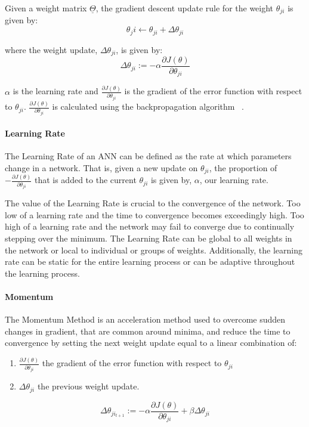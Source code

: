 \documentclass{article}
\begin{document}
Given a weight matrix $\underline\Theta$, the gradient descent update rule for the weight $\theta_{ji}$ is given by:
\begin{equation}
\theta_ji \leftarrow \theta_{ji} + \Delta\theta_{ji}
\end{equation}

where the weight update, $\Delta\theta_{ji}$, is given by:
\begin{equation}
	\Delta\theta_{ji} := -\alpha\frac{\partial{J}(\theta)}{\partial{\theta_{ji}}}
\end{equation}
 

 $\alpha$ is the learning rate and $\frac{\partial{J}(\theta)}{\partial{\theta_{ji}}}$ is the gradient of the error function with respect to $\theta_{ji}$.
$\frac{\partial{J}(\theta)}{\partial{\theta_{ji}}}$ is calculated using the backpropagation algorithm ~\cite{backpropagationOriginal}.

 
\paragraph{Learning Rate}
The Learning Rate of an ANN can be defined as the rate at which parameters change in a network. That is, given a new update on $\theta_{ji}$, the proportion of $-\frac{\partial{J}(\theta)}{\partial{\theta_{ji}}}$ that is added to the current $\theta_{ji}$ is given by, $\alpha$, our learning rate.
\hfill\newline

The value of the Learning Rate is crucial to the convergence of the network. Too low of a learning rate and the time to convergence becomes exceedingly high. Too high of a learning rate and the network may fail to converge due to continually stepping over the minimum. The Learning Rate can be global to all weights in the network or local to individual or groups of weights. Additionally, the learning rate can be static for the entire learning process or can be adaptive throughout the learning process.  
\paragraph{Momentum}
The Momentum Method is an acceleration method \cite{backpropagationOriginal} used to overcome sudden changes in gradient, that are common around minima, and reduce the time to convergence by setting the next weight update equal to a linear combination of:
\begin{enumerate}
	\item $\frac{\partial{J}(\theta)}{\partial{\theta_{ji}}}$ the gradient of the error function with respect to $\theta_{ji}$
	\item $\Delta\theta_{ji}$ the previous weight update.
\end{enumerate}  
\begin{equation}
\Delta\theta_{ji_{t+1}} := -\alpha\frac{\partial{J}(\theta)}{\partial{\theta_{ji}}} + \beta\Delta\theta_{ji}
\end{equation}
\end{document}
